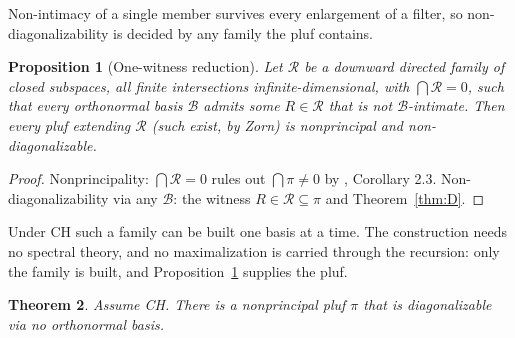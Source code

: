 \documentclass[11pt,reqno]{amsart}
\newtheorem{theorem}{Theorem}[section]
\newtheorem{proposition}[theorem]{Proposition}
\theoremstyle{definition}
\newcommand{\pluf}{\pi}
\begin{document}
Non-intimacy of a single member survives every enlargement of a filter, so
non-diagonalizability is decided by any family the pluf contains.

\begin{proposition}[One-witness reduction]\label{prop:reduction}
Let $\mathcal R$ be a downward directed family of closed subspaces, all finite
intersections infinite-dimensional, with $\bigcap\mathcal R=0$, such that every
orthonormal basis $\mathcal B$ admits some $R\in\mathcal R$ that is not
$\mathcal B$-intimate. Then every pluf extending $\mathcal R$ (such exist, by Zorn) is
nonprincipal and non-diagonalizable.
\end{proposition}

\begin{proof}
Nonprincipality: $\bigcap\mathcal R=0$ rules out $\bigcap\pluf\neq0$ by \cite{FWI},
Corollary 2.3. Non-diagonalizability via any $\mathcal B$: the witness $R\in\mathcal
R\subseteq\pluf$ and Theorem~\ref{thm:D}.
\end{proof}

Under CH such a family can be built one basis at a time. The construction needs no
spectral theory, and no maximalization is carried through the recursion: only the
family is built, and Proposition~\ref{prop:reduction} supplies the pluf.

\begin{theorem}\label{thm:E}
Assume CH. There is a nonprincipal pluf $\pluf$ that is diagonalizable via no
orthonormal basis.
\end{theorem}
\end{document}
